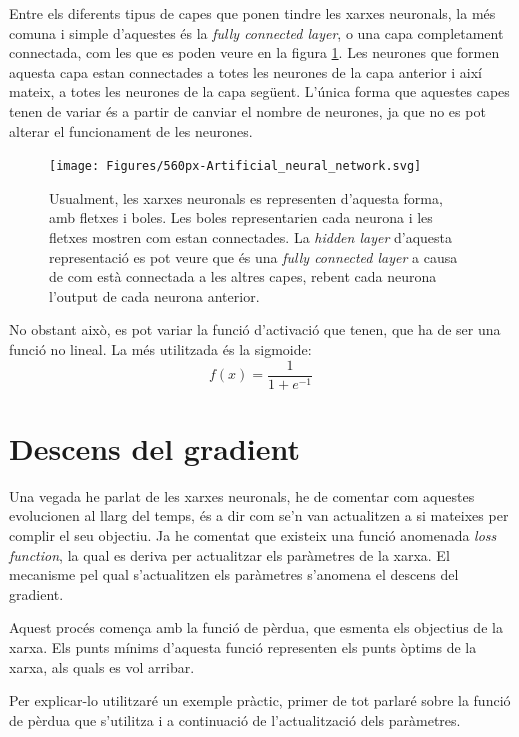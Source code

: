Entre els diferents tipus de capes que ponen tindre les xarxes neuronals, la més comuna i simple d'aquestes és la \textit{fully connected layer}, o una capa completament connectada, com les que es poden veure en la figura \ref{fig:560px-artificialneuralnetwork}. Les neurones que formen aquesta capa estan connectades a totes les neurones de la capa anterior i així mateix, a totes les neurones de la capa següent. L'única forma que aquestes capes tenen de variar és a partir de canviar el nombre de neurones, ja que no es pot alterar el funcionament de les neurones.
\begin{figure}[H]
	\centering
	\texttt{[image: Figures/560px-Artificial\_neural\_network.svg]}
	\caption{Usualment, les xarxes neuronals es representen d'aquesta forma, amb fletxes i boles. Les boles representarien cada neurona i les fletxes mostren com estan connectades. La \textit{hidden layer} d'aquesta representació es pot veure que és una \textit{fully connected layer} a causa de com està connectada a les altres capes, rebent cada neurona l'output de cada neurona anterior.}
	\label{fig:560px-artificialneuralnetwork}
\end{figure}
No obstant això, es pot variar la funció d'activació que tenen, que ha de ser una funció no lineal. La més utilitzada és la sigmoide:
$$
f(x) = \frac{1}{1+e^{-1}}
$$

\section{Descens del gradient}
Una vegada he parlat de les xarxes neuronals, he de comentar com aquestes evolucionen al llarg del temps, és a dir com se'n van actualitzen a si mateixes per complir el seu objectiu. Ja he comentat que existeix una funció anomenada \textit{loss function}, la qual es deriva per actualitzar els paràmetres de la xarxa. El mecanisme pel qual s'actualitzen els paràmetres s'anomena el descens del gradient.

Aquest procés comença amb la funció de pèrdua, que esmenta els objectius de la xarxa. Els punts mínims d'aquesta funció representen els punts òptims de la xarxa, als quals es vol arribar. 

 Per explicar-lo utilitzaré un exemple pràctic, primer de tot parlaré sobre la funció de pèrdua que s'utilitza i a continuació de l'actualització dels paràmetres. 
 
